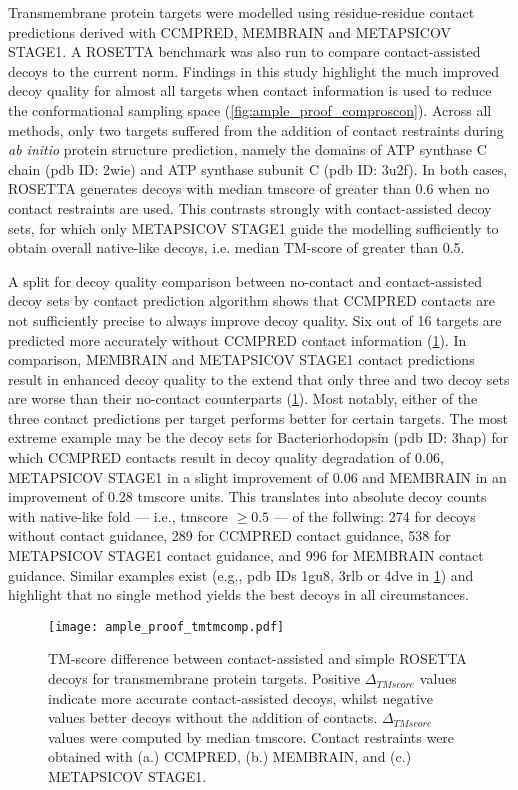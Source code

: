 Transmembrane protein targets were modelled using residue-residue contact predictions derived with CCMPRED, MEMBRAIN and METAPSICOV STAGE1. A ROSETTA benchmark was also run to compare contact-assisted decoys to the current norm. Findings in this study highlight the much improved decoy quality for almost all targets when contact information is used to reduce the conformational sampling space (\cref{fig:ample_proof_comproscon}). Across all methods, only two targets suffered from the addition of contact restraints during \textit{ab initio} protein structure prediction, namely the domains of ATP synthase C chain (\gls{pdb} ID: 2wie) and ATP synthase subunit C (\gls{pdb} ID: 3u2f). In both cases, ROSETTA generates decoys with median \gls{tmscore} of greater than 0.6 when no contact restraints are used. This contrasts strongly with contact-assisted decoy sets, for which only METAPSICOV STAGE1 guide the modelling sufficiently to obtain overall native-like decoys, i.e. median TM-score of greater than 0.5. 

A split for decoy quality comparison between no-contact and contact-assisted decoy sets by contact prediction algorithm shows that CCMPRED contacts are not sufficiently precise to always improve decoy quality. Six out of 16 targets are predicted more accurately without CCMPRED contact information (\cref{fig:ample_proof_tmtmcomp}). In comparison, MEMBRAIN and METAPSICOV STAGE1 contact predictions result in enhanced decoy quality to the extend that only three and two decoy sets are worse than their no-contact counterparts (\cref{fig:ample_proof_tmtmcomp}). Most notably, either of the three contact predictions per target performs better for certain targets. The most extreme example may be the decoy sets for Bacteriorhodopsin (\gls{pdb} ID: 3hap) for which CCMPRED contacts result in decoy quality degradation of 0.06, METAPSICOV STAGE1 in a slight improvement of 0.06 and MEMBRAIN in an improvement of 0.28 \gls{tmscore} units. This translates into absolute decoy counts with native-like fold --- i.e., \gls{tmscore} $\geq 0.5$ --- of the follwing: 274 for decoys without contact guidance, 289 for CCMPRED contact guidance, 538 for METAPSICOV STAGE1 contact guidance, and 996 for MEMBRAIN contact guidance. Similar examples exist (e.g., \gls{pdb} IDs 1gu8, 3rlb or 4dve in \cref{fig:ample_proof_tmtmcomp}) and highlight that no single method yields the best decoys in all circumstances.

\begin{figure}[H]
    \centering
    \texttt{[image: ample\_proof\_tmtmcomp.pdf]}
    \caption[TM-score difference between contact-assisted and simple ROSETTA decoys]{TM-score difference between contact-assisted and simple ROSETTA decoys for transmembrane protein targets. Positive $\Delta_{TMscore}$ values indicate more accurate contact-assisted decoys, whilst negative values better decoys without the addition of contacts. $\Delta_{TMscore}$ values were computed by median \gls{tmscore}. Contact restraints were obtained with (a.) CCMPRED, (b.) MEMBRAIN, and (c.) METAPSICOV STAGE1.}
    \label{fig:ample_proof_tmtmcomp}
\end{figure}

